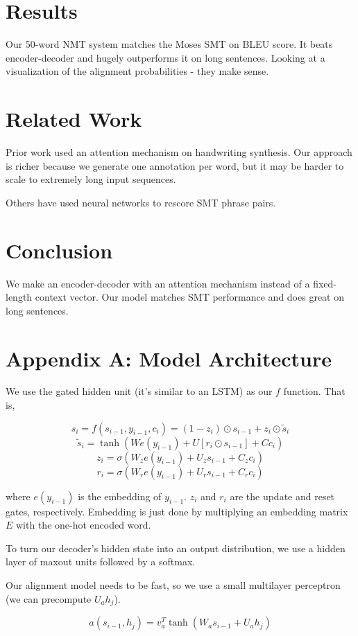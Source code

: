 \documentclass[a4paper]{article}
\begin{document}
\section{Results}
Our 50-word NMT system matches the Moses SMT on BLEU score. It beats
encoder-decoder and hugely outperforms it on long sentences. Looking at a
visualization of the alignment probabilities - they make sense.

\section{Related Work}
Prior work used an attention mechanism on handwriting synthesis. Our approach
is richer because we generate one annotation per word, but it may be
harder to scale to extremely long input sequences.

Others have used neural networks to rescore SMT phrase pairs.

\section{Conclusion}
We make an encoder-decoder with an attention mechanism instead of a fixed-length
context vector. Our model matches SMT performance and does great on long
sentences.

\section{Appendix A: Model Architecture}
We use the gated hidden unit (it's similar to an LSTM) as our $f$ function.
That is,

$$
s_i = f(s_{i-1}, y_{i-1}, c_i) = (1 - z_i) \odot s_{i-1} + z_i \odot \tilde{s}_i
$$
$$
\tilde{s}_i = \tanh{(W e(y_{i-1}) + U[r_i \odot s_{i-1}] + C c_i)}
$$
$$
z_i = \sigma{(W_z e(y_{i-1}) + U_z s_{i-1} + C_z c_i)}
$$
$$
r_i = \sigma{(W_r e(y_{i-1}) + U_r s_{i-1} + C_r c_i)}
$$

where $e(y_{i-1})$ is the embedding of $y_{i-1}$. $z_i$ and $r_i$ are the update
and reset gates, respectively. Embedding is just done by multiplying an
embedding matrix $E$ with the one-hot encoded word.

To turn our decoder's hidden state into an output distribution, we use a
hidden layer of maxout units followed by a softmax.

Our alignment model needs to be fast, so we use a small multilayer perceptron
(we can precompute $U_a h_j$).

$$
a(s_{i-1}, h_j) = v_a^T \tanh{(W_a s_{i-1} + U_a h_j)}
$$
\end{document}
